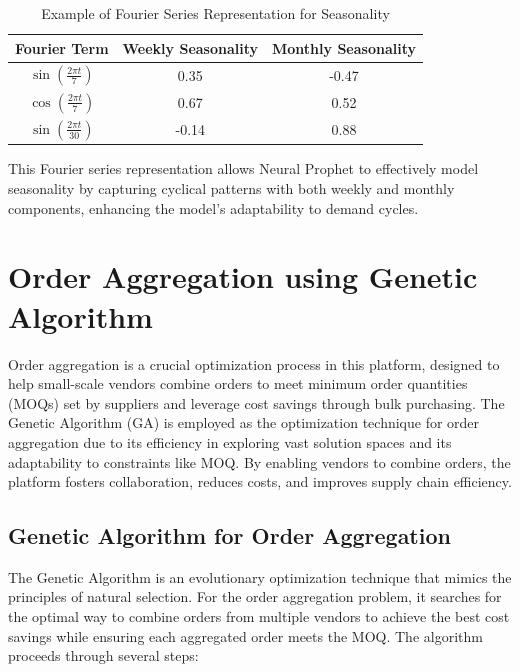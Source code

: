 \begin{table}[H]
\centering
\caption{Example of Fourier Series Representation for Seasonality}
\begin{tabular}{|c|c|c|}
\hline
\textbf{Fourier Term} & \textbf{Weekly Seasonality} & \textbf{Monthly Seasonality} \\ \hline
\( \sin\left(\frac{2 \pi t}{7}\right) \) & 0.35 & -0.47 \\ \hline
\( \cos\left(\frac{2 \pi t}{7}\right) \) & 0.67 & 0.52 \\ \hline
\( \sin\left(\frac{2 \pi t}{30}\right) \) & -0.14 & 0.88 \\ \hline
\end{tabular}
\end{table}

This Fourier series representation allows Neural Prophet to effectively model seasonality by capturing cyclical patterns with both weekly and monthly components, enhancing the model's adaptability to demand cycles.

\section{Order Aggregation using Genetic Algorithm}


Order aggregation is a crucial optimization process in this platform, designed to help small-scale vendors combine orders to meet minimum order quantities (MOQs) set by suppliers and leverage cost savings through bulk purchasing. The Genetic Algorithm (GA) is employed as the optimization technique for order aggregation due to its efficiency in exploring vast solution spaces and its adaptability to constraints like MOQ. By enabling vendors to combine orders, the platform fosters collaboration, reduces costs, and improves supply chain efficiency.

\subsection{Genetic Algorithm for Order Aggregation}

The Genetic Algorithm is an evolutionary optimization technique that mimics the principles of natural selection. For the order aggregation problem, it searches for the optimal way to combine orders from multiple vendors to achieve the best cost savings while ensuring each aggregated order meets the MOQ. The algorithm proceeds through several steps:

